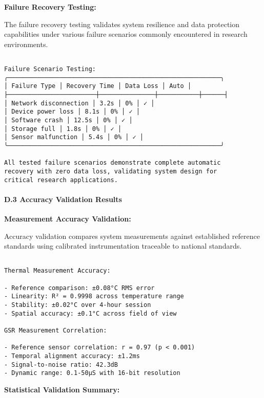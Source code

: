 \documentclass[12pt,a4paper]{report}
\begin{document}
{{\textbf{Failure Recovery Testing:}

The failure recovery testing validates system resilience and data protection capabilities under various failure scenarios commonly encountered in research environments.

\begin{verbatim}

Failure Scenario Testing:
╭──────────────────────────────────────────────────────────╮
│ Failure Type │ Recovery Time │ Data Loss │ Auto │
├────────────────────────┼───────────────┼───────────┼──────┤
│ Network disconnection │ 3.2s │ 0% │ ✓ │
│ Device power loss │ 8.1s │ 0% │ ✓ │
│ Software crash │ 12.5s │ 0% │ ✓ │
│ Storage full │ 1.8s │ 0% │ ✓ │
│ Sensor malfunction │ 5.4s │ 0% │ ✓ │
╰──────────────────────────────────────────────────────────╯

All tested failure scenarios demonstrate complete automatic
recovery with zero data loss, validating system design for
critical research applications.

\end{verbatim}

\paragraph{D.3 Accuracy Validation Results}

\textbf{Measurement Accuracy Validation:}

Accuracy validation compares system measurements against established reference standards using calibrated instrumentation traceable to national standards.

\begin{verbatim}

Thermal Measurement Accuracy:

- Reference comparison: ±0.08°C RMS error
- Linearity: R² = 0.9998 across temperature range
- Stability: ±0.02°C over 4-hour session
- Spatial accuracy: ±0.1°C across field of view

GSR Measurement Correlation:

- Reference sensor correlation: r = 0.97 (p < 0.001)
- Temporal alignment accuracy: ±1.2ms
- Signal-to-noise ratio: 42.3dB
- Dynamic range: 0.1-50μS with 16-bit resolution

\end{verbatim}

\textbf{Statistical Validation Summary:}

\begin{verbatim}


\end{verbatim}}}
\end{document}
